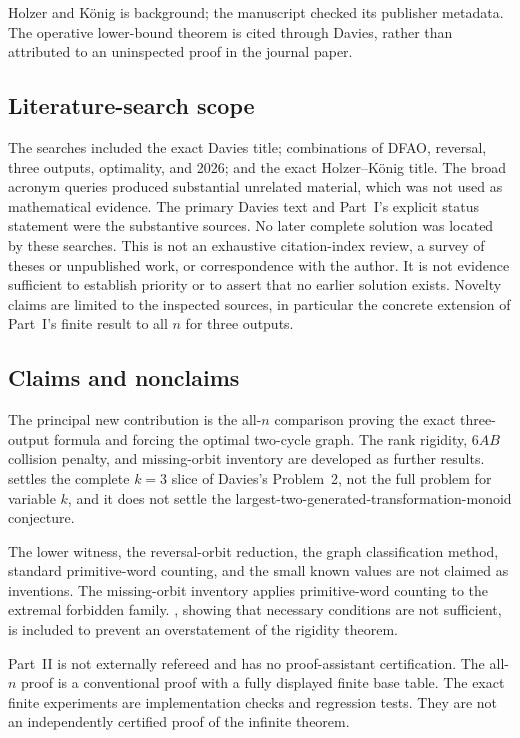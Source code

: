 \documentclass[11pt,a4paper]{article}
\numberwithin{equation}{section}
\theoremstyle{definition}
\theoremstyle{remark}
\begin{document}
Holzer and K\"onig \cite{HolzerKoenig2004} is background; the manuscript
checked its publisher metadata. The operative lower-bound theorem is cited
through Davies, rather than attributed to an uninspected proof in the journal
paper.

\subsection{Literature-search scope}

The searches included the exact Davies title; combinations of DFAO, reversal,
three outputs, optimality, and 2026; and the exact Holzer--K\"onig title. The
broad acronym queries produced substantial unrelated material, which was not
used as mathematical evidence. The primary Davies text and Part~I's explicit
status statement were the substantive sources. No later complete solution was
located by these searches. This is not an exhaustive citation-index review, a
survey of theses or unpublished work, or correspondence with the author. It is
not evidence sufficient to establish priority or to assert that no earlier
solution exists. Novelty claims are limited to the inspected sources, in
particular the concrete extension of Part~I's finite result to all $n$ for
three outputs.

\subsection{Claims and nonclaims}

The principal new contribution is the all-$n$ comparison proving the exact
three-output formula and forcing the optimal two-cycle graph. The rank
rigidity, $6AB$ collision penalty, and missing-orbit inventory are developed as
further results.  settles the complete $k=3$ slice of
Davies's Problem~2, not the full problem for variable $k$, and it does not
settle the largest-two-generated-transformation-monoid conjecture.

The lower witness, the reversal-orbit reduction, the graph classification
method, standard primitive-word counting, and the small known values are not
claimed as inventions. The missing-orbit inventory applies primitive-word
counting to the extremal forbidden family. , showing
that necessary conditions are not sufficient, is included to prevent an
overstatement of the rigidity theorem.

Part~II is not externally refereed and has no proof-assistant certification.
The all-$n$ proof is a conventional proof with a fully displayed finite base
table. The exact finite experiments are implementation checks and regression
tests. They are not an independently certified proof of the infinite theorem.
\end{document}
